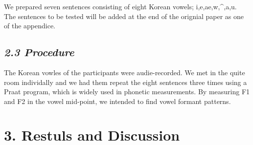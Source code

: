 \documentclass[man, fleqn, noextraspace]{apa6}
\begin{document}
We prepared seven sentences consisting of eight Korean vowels;
i,e,ae,w,\^{},a,u. The sentences to be tested will be added at the end
of the orignial paper as one of the appendice.

\subsection{\texorpdfstring{\emph{2.3
Procedure}}{2.3 Procedure}}\label{procedure}

The Korean vowles of the participants were audie-recorded. We met in the
quite room individally and we had them repeat the eight sentences three
times using a Praat program, which is widely used in phonetic
measurements. By measuring F1 and F2 in the vowel mid-point, we intended
to find vowel formant patterns.

\section{\texorpdfstring{\textbf{3. Restuls and
Discussion}}{3. Restuls and Discussion}}\label{restuls-and-discussion}
\end{document}
